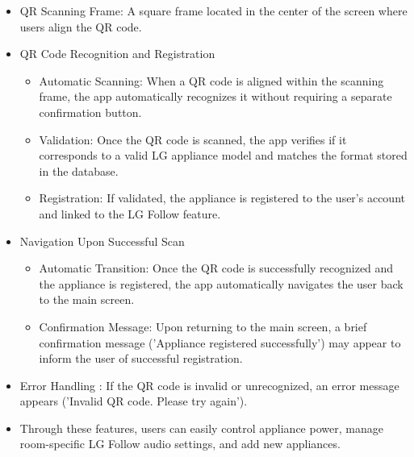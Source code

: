 \documentclass[conference]{IEEEtran}
\begin{document}
\begin{itemize}
    \item QR Scanning Frame: A square frame located in the center of the screen where users align the QR code.\\
    \item QR Code Recognition and Registration
\begin{itemize}
    \item Automatic Scanning: When a QR code is aligned within the scanning frame, the app automatically recognizes it without requiring a separate confirmation button.\\
    \item Validation: Once the QR code is scanned, the app verifies if it corresponds to a valid LG appliance model and matches the format stored in the database.\\
    \item Registration: If validated, the appliance is registered to the user’s account and linked to the LG Follow feature.\\
\end{itemize}
\end{itemize}
\begin{itemize}
    \item Navigation Upon Successful Scan
\begin{itemize}
    \item Automatic Transition: Once the QR code is successfully recognized and the appliance is registered, the app automatically navigates the user back to the main screen.\\
    \item Confirmation Message: Upon returning to the main screen, a brief confirmation message ('Appliance registered successfully') may appear to inform the user of successful registration.\\
\end{itemize}
\end{itemize}
\begin{itemize}
    \item Error Handling : If the QR code is invalid or unrecognized, an error message appears ('Invalid QR code. Please try again').\\
    \item     Through these features, users can easily control appliance power, manage room-specific LG Follow audio settings, and add new appliances.\\
\end{itemize}
\end{document}
